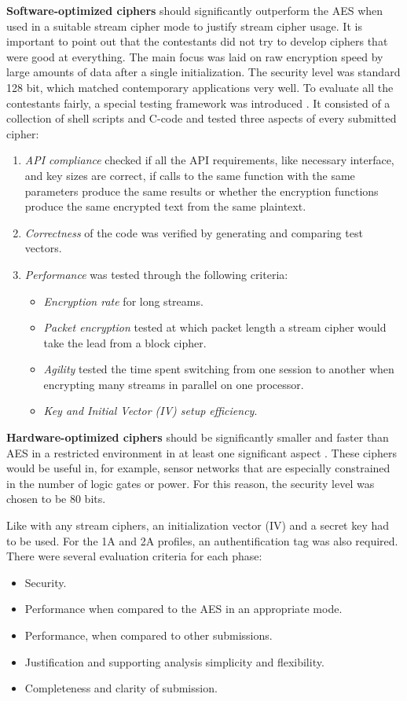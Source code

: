 	\textbf{Software-optimized ciphers} should significantly outperform the AES when used in a suitable stream cipher mode to justify stream cipher usage. It is important to point out that the contestants did not try to develop ciphers that were good at everything. The main focus was laid on raw encryption speed by large amounts of data after a single initialization. The security level was standard 128 bit, which matched contemporary applications very well.
	To evaluate all the contestants fairly, a special testing framework was introduced \cite{canniere2008estream}. It consisted of a collection of shell scripts and C-code and tested three aspects of every submitted cipher:
	\begin{enumerate}
		\item \emph{API compliance} checked if all the API requirements, like necessary interface, and key sizes are correct, if calls to the same function with the same parameters produce the same results or whether the encryption functions produce the same encrypted text from the same plaintext. 
		\item \emph{Correctness} of the code was verified by generating and comparing test vectors.
		\item \emph{Performance} was tested through the following criteria:
		\begin{itemize}
			\item \emph{Encryption rate} for long streams.
			\item\emph{Packet encryption} tested at which packet length a stream cipher would take the lead from a block cipher.
			\item \emph{Agility} tested the time spent switching from one session to another when encrypting many streams in parallel on one processor.
			\item \emph{Key and Initial Vector (IV) setup efficiency}.
		\end{itemize}
	\end{enumerate}
	
	\textbf{Hardware-optimized ciphers} should be significantly smaller and faster  than AES in a restricted environment in at least one significant aspect \cite{good2008asic}. These ciphers would be useful in, for example, sensor networks that are especially constrained in the number of logic gates or power. For this reason, the security level was chosen to be 80 bits.
	
	Like with any stream ciphers, an initialization vector (IV) and a secret key had to be used. For the 1A and 2A profiles, an authentification tag was also required.\\
	There were several evaluation criteria for each phase:
	\begin{itemize}
		\setlength\itemsep{0.1em}
		\item Security.
		\item Performance when compared to the AES in an appropriate mode.
		\item Performance, when compared to other submissions.
		\item Justification and supporting analysis simplicity and flexibility.
		\item Completeness and clarity of submission.
	\end{itemize}
	
